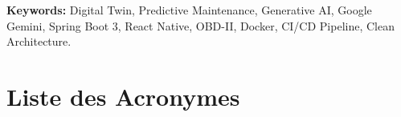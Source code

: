 \documentclass[12pt,a4paper,oneside]{report}
\begin{document}
\medskip
\noindent\textbf{Keywords:} Digital Twin, Predictive Maintenance, Generative AI, Google Gemini, Spring Boot 3, React Native, OBD-II, Docker, CI/CD Pipeline, Clean Architecture.

\clearpage

\tableofcontents
\clearpage

\listoffigures
{}
\clearpage

\listoftables
{}
\clearpage

\chapter*{Liste des Acronymes}
\end{document}

